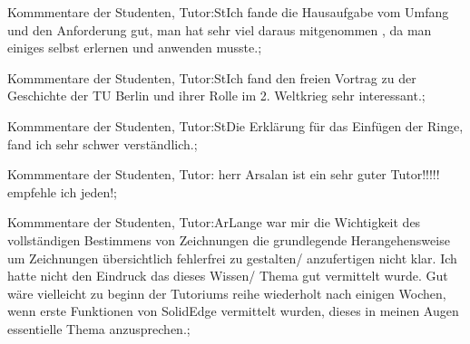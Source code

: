 \documentclass[10pt]{beamer}
\begin{document}
\begin{frame}[fragile]{Kommmentare der Studenten, Tutor:St}Ich fande die Hausaufgabe vom Umfang und den Anforderung gut, man hat sehr viel daraus mitgenommen , da man einiges selbst erlernen und anwenden musste.;
 \end{frame}
\begin{frame}[fragile]{Kommmentare der Studenten, Tutor:St}Ich fand den freien Vortrag zu der Geschichte der TU Berlin und ihrer Rolle im 2. Weltkrieg sehr interessant.;
 \end{frame}
\begin{frame}[fragile]{Kommmentare der Studenten, Tutor:St}Die Erklärung für das Einfügen der Ringe, fand ich sehr schwer verständlich.;
 \end{frame}
\begin{frame}[fragile]{Kommmentare der Studenten, Tutor: }herr Arsalan ist ein sehr guter Tutor!!!!! empfehle ich jeden!;
 \end{frame}
\begin{frame}[fragile]{Kommmentare der Studenten, Tutor:Ar}Lange war mir die Wichtigkeit des vollständigen Bestimmens von Zeichnungen   die grundlegende Herangehensweise um Zeichnungen übersichtlich   fehlerfrei zu gestalten/ anzufertigen nicht klar.   Ich hatte nicht den Eindruck das dieses Wissen/ Thema gut vermittelt wurde.  Gut wäre vielleicht zu beginn der Tutoriums reihe   wiederholt nach einigen Wochen, wenn erste Funktionen von SolidEdge vermittelt wurden, dieses in meinen Augen essentielle Thema anzusprechen.;
 \end{frame}
\end{document}
